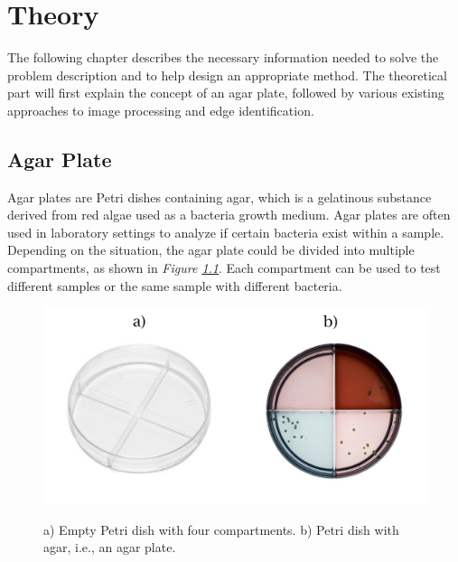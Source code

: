 


\chapter{Theory}
The following chapter describes the necessary information needed to solve the problem description and to help design an appropriate method. The theoretical part will first explain the concept of an agar plate, followed by various existing approaches to image processing and edge identification. 
\\

\section{Agar Plate}
Agar plates are Petri dishes containing agar, which is a gelatinous substance derived from red algae used as a bacteria growth medium. Agar plates are often used in laboratory settings to analyze if certain bacteria exist within a sample. Depending on the situation, the agar plate could be divided into multiple compartments, as shown in \textit{Figure \ref{fig:agar plate}}. Each compartment can be used to test different samples or the same sample with different bacteria.



    \begin{figure}[H]
        \begin{center}
            \includegraphics[width=.7\linewidth]{figures/petri.jpg}\\
            \caption{ a) Empty Petri dish with four compartments. b) Petri dish with agar, i.e., an agar plate.}
            \label{fig:agar plate}
        \end{center}
    \end{figure}

